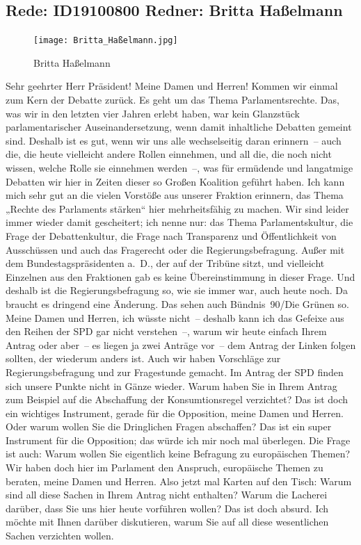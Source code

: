\documentclass[a4paper,11pt]{article}
\begin{document}
\subsection{Rede: ID19100800  Redner: Britta Haßelmann}

\begin{figure}[ht]

\centering

\texttt{[image: Britta\_Haßelmann.jpg]}

\caption{Britta Haßelmann}

\end{figure}

Sehr geehrter Herr Präsident! Meine Damen und Herren! Kommen wir einmal zum Kern der Debatte zurück. Es geht um das Thema Parlamentsrechte. Das, was wir in den letzten vier Jahren erlebt haben, war kein Glanzstück parlamentarischer Auseinandersetzung, wenn damit inhaltliche Debatten gemeint sind. Deshalb ist es gut, wenn wir uns alle wechselseitig daran erinnern – auch die, die heute vielleicht andere Rollen einnehmen, und all die, die noch nicht wissen, welche Rolle sie einnehmen werden –, was für ermüdende und langatmige Debatten wir hier in Zeiten dieser so Großen Koalition geführt haben. Ich kann mich sehr gut an die vielen Vorstöße aus unserer Fraktion erinnern, das Thema „Rechte des Parlaments stärken“ hier mehrheitsfähig zu machen. Wir sind leider immer wieder damit gescheitert; ich nenne nur: das Thema Parlamentskultur, die Frage der Debattenkultur, die Frage nach Transparenz und Öffentlichkeit von Ausschüssen und auch das Fragerecht oder die Regierungsbefragung. Außer mit dem Bundestagspräsidenten a. D., der auf der Tribüne sitzt, und vielleicht Einzelnen aus den Fraktionen gab es keine Übereinstimmung in dieser Frage. Und deshalb ist die Regierungsbefragung so, wie sie immer war, auch heute noch. Da braucht es dringend eine Änderung. Das sehen auch Bündnis 90/Die Grünen so. Meine Damen und Herren, ich wüsste nicht – deshalb kann ich das Gefeixe aus den Reihen der SPD gar nicht verstehen –, warum wir heute einfach Ihrem Antrag oder aber – es liegen ja zwei Anträge vor – dem Antrag der Linken folgen sollten, der wiederum anders ist. Auch wir haben Vorschläge zur Regierungsbefragung und zur Fragestunde gemacht. Im Antrag der SPD finden sich unsere Punkte nicht in Gänze wieder. Warum haben Sie in Ihrem Antrag zum Beispiel auf die Abschaffung der Konsumtionsregel verzichtet? Das ist doch ein wichtiges Instrument, gerade für die Opposition, meine Damen und Herren. Oder warum wollen Sie die Dringlichen Fragen abschaffen? Das ist ein super Instrument für die Opposition; das würde ich mir noch mal überlegen. Die Frage ist auch: Warum wollen Sie eigentlich keine Befragung zu europäischen Themen? Wir haben doch hier im Parlament den Anspruch, europäische Themen zu beraten, meine Damen und Herren. Also jetzt mal Karten auf den Tisch: Warum sind all diese Sachen in Ihrem Antrag nicht enthalten? Warum die Lacherei darüber, dass Sie uns hier heute vorführen wollen? Das ist doch absurd. Ich möchte mit Ihnen darüber diskutieren, warum Sie auf all diese wesentlichen Sachen verzichten wollen.
\end{document}
